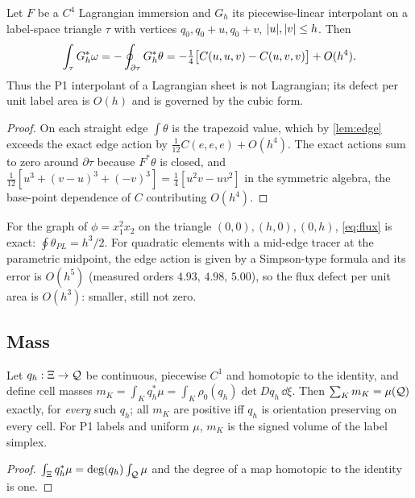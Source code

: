 \begin{proposition}\label{prop:flux}
Let $F$ be a $C^4$ Lagrangian immersion and $G_h$ its piecewise-linear interpolant on a label-space triangle
$\tau$ with vertices $q_0,q_0+u,q_0+v$, $\lvert u\rvert,\lvert v\rvert\le h$. Then
\begin{equation}\label{eq:flux}
\int_\tau G_h^*\omega=-\oint_{\partial\tau}G_h^*\theta=-\tfrac14\big[C(u,u,v)-C(u,v,v)\big]+O(h^4).
\end{equation}
Thus the P1 interpolant of a Lagrangian sheet is not Lagrangian; its defect per unit label area is $O(h)$ and is
governed by the cubic form.
\end{proposition}
\begin{proof}
On each straight edge $\int\theta$ is the trapezoid value, which by \cref{lem:edge} exceeds the exact edge action by
$\tfrac1{12}C(e,e,e)+O(h^4)$. The exact actions sum to zero around $\partial\tau$ because $F^*\theta$ is closed, and
$\tfrac1{12}[u^3+(v-u)^3+(-v)^3]=\tfrac14[u^2v-uv^2]$ in the symmetric algebra, the base-point dependence of $C$
contributing $O(h^4)$.
\end{proof}

For the graph of $\phi=x_1^2x_2$ on the triangle $(0,0),(h,0),(0,h)$, \eqref{eq:flux} is exact:
$\oint\theta_{PL}=h^3/2$. For quadratic elements with a mid-edge tracer at the parametric midpoint, the edge
action is given by a Simpson-type formula and its error is $O(h^5)$ (measured orders $4.93,\,4.98,\,5.00$), so the
flux defect per unit area is $O(h^3)$: smaller, still not zero.

\subsection{Mass}\label{sec:mass}

\begin{proposition}\label{prop:mass}
Let $q_h:\Xi\to\mathcal{Q}$ be continuous, piecewise $C^1$ and homotopic to the identity, and define cell masses
$m_K=\int_K q_h^*\mu=\int_K\rho_0(q_h)\det Dq_h\,\dd\xi$. Then $\sum_Km_K=\mu(\mathcal{Q})$ exactly, for \emph{every} such
$q_h$; all $m_K$ are positive iff $q_h$ is orientation preserving on every cell. For P1 labels and uniform $\mu$,
$m_K$ is the signed volume of the label simplex.
\end{proposition}
\begin{proof}
$\int_\Xi q_h^*\mu=\deg(q_h)\int_{\mathcal{Q}}\mu$ and the degree of a map homotopic to the identity is one.
\end{proof}

